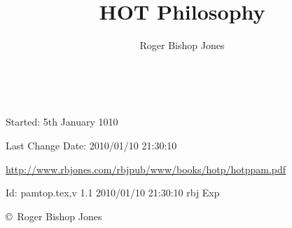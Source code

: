 \documentclass[10pt,a4paper.titlepage,openany,twocolumn]{book}
\author{Roger Bishop Jones}
\title{HOT Philosophy}
\date{\ }
\begin{document}
\frontmatter

\begin{titlepage}
\maketitle

\vfill

\begin{centering}

{\footnotesize

Started: 5th January 1010

Last Change $ $Date: 2010/01/10 21:30:10 $ $

\href{http://www.rbjones.com/rbjpub/www/books/hotp/hotppam.pdf}
{http://www.rbjones.com/rbjpub/www/books/hotp/hotppam.pdf}

$ $Id: pamtop.tex,v 1.1 2010/01/10 21:30:10 rbj Exp $ $

\copyright\ Roger Bishop Jones

}%

\end{centering}

\thispagestyle{empty}
\end{titlepage}

\onecolumn

{\parskip=0pt\tableofcontents}

\vfill

\pagebreak

\twocolumn
\end{document}
